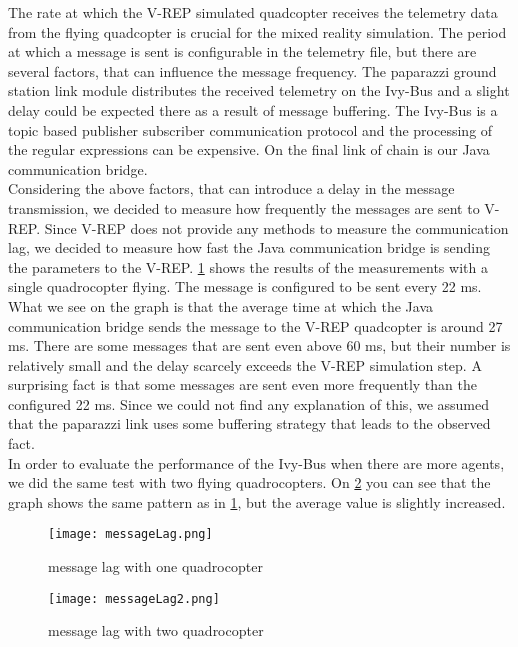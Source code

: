 The rate at which the V-REP simulated quadcopter receives the telemetry data from the flying quadcopter is crucial for the mixed reality simulation. The period at which a message is sent is configurable in the telemetry file, but there are several factors, that can influence the message frequency. The paparazzi ground station link module distributes the received telemetry on the Ivy-Bus and a slight delay could be expected there as a result of message buffering. The Ivy-Bus is a topic based publisher subscriber communication protocol and the processing of the regular expressions can be expensive. On the final link of chain is our Java communication bridge.\\

Considering the above factors, that can introduce a delay in the message transmission, we decided to measure how frequently the messages are sent to V-REP. Since V-REP does not provide any methods to measure the communication lag, we decided to measure how fast the Java communication bridge is sending the parameters to the V-REP. \ref{fig:messageLag} shows the results of the measurements with a single quadrocopter flying. The message is configured to be sent every 22 ms. What we see on the graph is that the average time at which the Java communication bridge sends the message to the V-REP quadcopter is around 27 ms. There are some messages that are sent even above 60 ms, but their number is relatively small and the delay scarcely exceeds the V-REP simulation step. A surprising fact is that some messages are sent even more frequently than the configured 22 ms. Since we could not find any explanation of this, we assumed that the paparazzi link uses some buffering strategy that leads to the observed fact. \\
In order to evaluate the performance of the Ivy-Bus when there are more agents, we did the same test with two flying quadrocopters. On \ref{fig:messageLag2} you can see that the graph shows the same pattern as in \ref{fig:messageLag}, but the average value is slightly increased.

\begin{figure}[h!]
 \begin{center}
  \texttt{[image: messageLag.png]}
 \end{center}
  \caption{message lag with one quadrocopter\label{fig:messageLag}}
\end{figure}

\begin{figure}[h!]
 \begin{center}
  \texttt{[image: messageLag2.png]}
 \end{center}
  \caption{message lag with two quadrocopter\label{fig:messageLag2}}
\end{figure}



